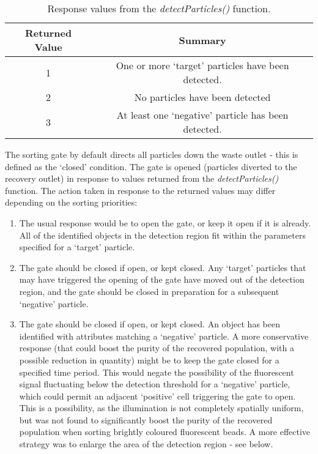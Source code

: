 \begin{table}[b]
	\centering
		\begin{tabular} {c c}
		\hline
		Returned Value & Summary \\
		\hline
		1 & One or more `target' particles have been detected. \\
		2 & No particles have been detected \\
		3 & At least one `negative' particle has been detected. \\
		\hline			
		\end{tabular}
	\caption{Response values from the \textit{detectParticles()} function.}
	\label{tab:sorter_response_values}
\end{table}

The sorting gate by default directs all particles down the waste outlet - this is defined as the `closed' condition. The gate is opened (particles diverted to the recovery outlet) in response to values returned from the \textit{detectParticles()} function. The action taken in response to the returned values may differ depending on the sorting priorities:
\begin{enumerate}
	\item The usual response would be to open the gate, or keep it open if it is already. All of the identified objects in the detection region fit within the parameters specified for a `target' particle.
	\item The gate should be closed if open, or kept closed. Any `target' particles that may have triggered the opening of the gate have moved out of the detection region, and the gate should be closed in preparation for a subsequent `negative' particle.
	\item The gate should be closed if open, or kept closed. An object has been identified with attributes matching a `negative' particle. A more conservative response (that could boost the purity of the recovered population, with a possible reduction in quantity) might be to keep the gate closed for a specified time period. This would negate the possibility of the fluorescent signal fluctuating below the detection threshold for a `negative' particle, which could permit an adjacent `positive' cell triggering the gate to open. This is a possibility, as the illumination is not completely spatially uniform, but was not found to significantly boost the purity of the recovered population when sorting brightly coloured fluorescent beads. A more effective strategy was to enlarge the area of the detection region - see below.
\end{enumerate}


